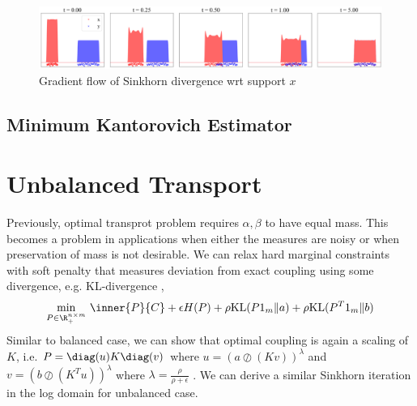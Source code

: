 \documentclass[11pt]{article}
\begin{document}
\begin{center} 
\begin{figure}[h!]
    \includegraphics[width=\textwidth]{assets/plt_gradientflow1d} 
    \caption{Gradient flow of Sinkhorn divergence wrt support $x$}
    \label{fig:plt_gradientflow1d}
\end{figure}
\end{center} 


\subsection{Minimum Kantorovich Estimator}



 

\section{Unbalanced Transport}

Previously, optimal transprot problem requires $\alpha,\beta$ to have equal mass. This becomes a problem in applications when either the measures are noisy or when preservation of mass is not desirable. We can relax hard marginal constraints with soft penalty that measures deviation from exact coupling using some divergence, e.g. KL-divergence \cite{chizatScalingAlgorithmsUnbalanced2017},
\begin{align}
    \min_{P\in\R^{n\times m}_+}\, 
        \inner{P}{C} + \epsilon H(P) + \rho \text{KL}(P1_m \Vert a) + \rho \text{KL}(P^T 1_m \Vert b)
\end{align}
Similar to balanced case, we can show that optimal coupling is again a scaling of $K$, i.e. $P = \diag(u) K \diag(v)$ where $u = (a \oslash (Kv))^{\lambda}$ and $v = (b \oslash (K^T u))^{\lambda}$ where $\lambda = \frac{\rho}{\rho + \epsilon}$ \cite{frognerLearningWassersteinLoss2015}. We can derive a similar Sinkhorn iteration in the log domain for unbalanced case.








\newpage
\printbibliography 
\end{document}

